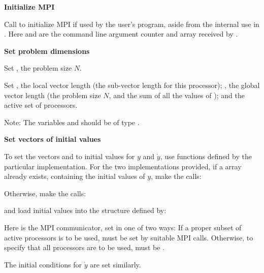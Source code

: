 \begin{Steps}
  
\item 
  {\bf {\p} Initialize MPI}

  Call  to initialize MPI if used by
  the user's program, aside from the internal use in {\nvecp}.  
  Here  and  are the command line argument 
  counter and array received by .
  
\item
  {\bf Set problem dimensions}

  {\s} Set , the problem size $N$.

  {\p} Set , the local vector length (the sub-vector
  length for this processor); , the global vector length (the
  problem size $N$, and the sum of all the values of );
  and the active set of processors.

  Note: The variables  and  should be of type .

\item
  {\bf Set vectors of initial values}
 
  To set the vectors  and  to initial values for $y$ and $\dot{y}$, 
  use functions defined by the particular {\nvector} implementation. 
  For the two {\nvector} implementations provided, if a  array  
  already exists, containing the initial values of $y$, make the calls:

  {\s} 

  {\p} 

  Otherwise, make the calls:

  {\s} 

  {\p} 

  and load initial values into the structure defined by:

  {\s} 

  {\p} 

  Here  is the MPI communicator, set in one of two ways: 
  If a proper subset of active processors is to be used,  
  must be set by suitable MPI calls. Otherwise, to specify that all 
  processors are to be used,  must be .
  
  The initial conditions for $\dot{y}$ are set similarly.


\end{Steps}
